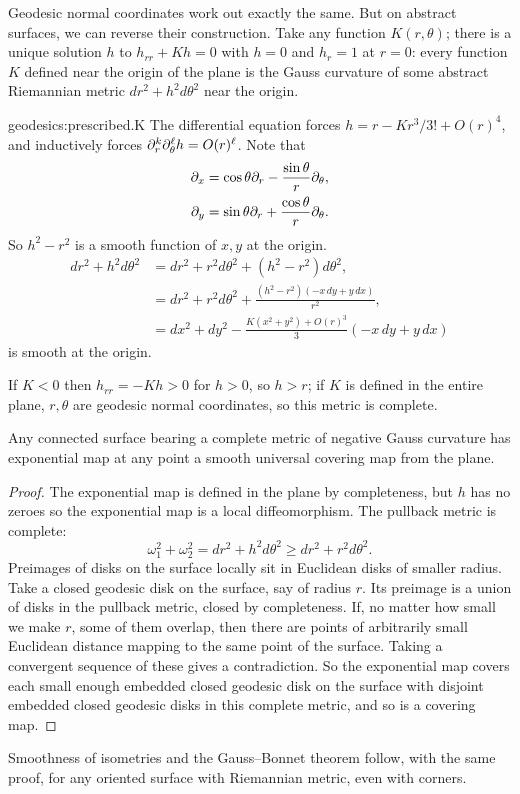 Geodesic normal coordinates work out exactly the same.
But on abstract surfaces, we can reverse their construction.
Take any function \(K(r,\theta)\); there is a unique solution \(h\) to \(h_{rr}+Kh=0\) with \(h=0\) and \(h_r=1\) at \(r=0\): every function \(K\) defined near the origin of the plane is the Gauss curvature of some abstract Riemannian metric \(dr^2 + h^2d\theta^2\) near the origin.
\begin{answer}{geodesics:prescribed.K}
The differential equation forces \(h=r-Kr^3/3!+O(r)^4\), and inductively forces \(\partial_{r}^k\partial_{\theta}^{\ell} h=O(r)^{\ell}\).
Note that
\begin{align*}
\partial_{x}&=\cos\theta\partial_{r}-\frac{\sin\theta}{r}\partial_{\theta},\\
\partial_{y}&=\sin\theta\partial_{r}+\frac{\cos\theta}{r}\partial_{\theta}.
\end{align*}
So \(h^2-r^2\) is a smooth function of \(x,y\) at the origin.
\begin{align*}
dr^2+h^2d\theta^2
&=
dr^2+r^2d\theta^2+(h^2-r^2)d\theta^2,
\\
&=
dr^2+r^2d\theta^2+\frac{(h^2-r^2)(-x\,dy+y\,dx)}{r^2},
\\
&=
dx^2+dy^2-\frac{K(x^2+y^2)+O(r)^3}{3}(-x\,dy+y\,dx)
\end{align*}
is smooth at the origin.
\end{answer}
If \(K<0\) then \(h_{rr}=-Kh>0\) for \(h>0\), so \(h>r\); if \(K\) is defined in the entire plane, \(r,\theta\) are geodesic normal coordinates, so this metric is complete.
\begin{theorem}\label{theorem:complete.negative.Gauss}
Any connected surface bearing a complete metric of negative Gauss curvature has exponential map at any point a smooth universal covering map from the plane.
\end{theorem}
\begin{proof}
The exponential map is defined in the plane by completeness, but \(h\) has no zeroes so the exponential map is a local diffeomorphism.
The pullback metric is complete:
\[
\omega_1^2+\omega_2^2=dr^2+h^2d\theta^2\ge dr^2+r^2d\theta^2.
\]
Preimages of disks on the surface locally sit in Euclidean disks of smaller radius.
Take a closed geodesic disk on the surface, say of radius \(r\).
Its preimage is a union of disks in the pullback metric, closed by completeness.
If,  no matter how small we make \(r\), some of them overlap, then there are points of arbitrarily small Euclidean distance mapping to the same point of the surface.
Taking a convergent sequence of these gives a contradiction.
So the exponential map covers each small enough embedded closed geodesic disk on the surface with disjoint embedded closed geodesic disks in this complete metric, and so is a covering map.
\end{proof}

Smoothness of isometries and the Gauss--Bonnet theorem follow, with the same proof, for any oriented surface with Riemannian metric, even with corners.

